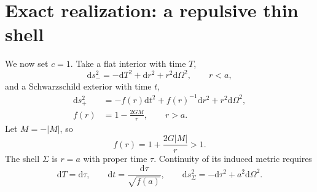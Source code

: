 \documentclass[aps,prd,twocolumn,amsmath,amssymb,nofootinbib]{revtex4-2}
\newcommand{\dd}{\mathrm{d}}
\begin{document}
\section{Exact realization: a repulsive thin shell}
\label{sec:shell}

We now set $c=1$.  Take a flat interior with time $T$,
\begin{equation}
 \dd s^2_-=-\dd T^2+\dd r^2+r^2\dd\Omega^2,
 \qquad r<a,
 \label{eq:interior}
\end{equation}
and a Schwarzschild exterior with time $t$,
\begin{equation}
 \begin{aligned}
  \dd s^2_+&=-f(r)\dd t^2+f(r)^{-1}\dd r^2
               +r^2\dd\Omega^2,\\
  f(r)&=1-\frac{2GM}{r},\qquad r>a.
 \end{aligned}
 \label{eq:exterior}
\end{equation}
Let $M=-|M|$, so
\begin{equation}
 f(r)=1+\frac{2G|M|}{r}>1.
 \label{eq:negativef}
\end{equation}
The shell $\Sigma$ is $r=a$ with proper time $\tau$.  Continuity of its
induced metric requires
\begin{equation}
 \dd T=\dd\tau,
 \qquad
 \dd t=\frac{\dd\tau}{\sqrt{f(a)}},
 \qquad
 \dd s^2_{\Sigma}=-\dd\tau^2+a^2\dd\Omega^2.
 \label{eq:matching}
\end{equation}
\end{document}
